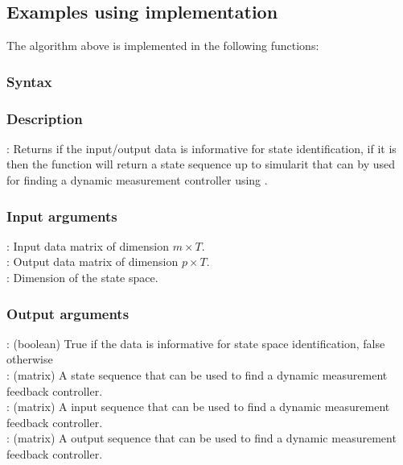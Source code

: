 \subsection{Examples using implementation}
The algorithm above is implemented in the following functions:
\subsubsection*{Syntax}

\subsubsection*{Description}
: Returns if the input/output data is informative for state identification, if it is then the function will return a state sequence up to simularit that can by used for finding a dynamic measurement controller using .

\subsubsection*{Input arguments}
\textbf{}: Input data matrix of dimension $m \times T$.\\
\textbf{}: Output data matrix of dimension $p \times T$.\\
\textbf{}: Dimension of the state space.

\subsubsection*{Output arguments}
\textbf{}: (boolean) True if the data is informative for state space identification, false otherwise\\
\textbf{}: (matrix) A state sequence that can be used to find a dynamic measurement feedback controller.\\
\textbf{}: (matrix) A input sequence that can be used to find a dynamic measurement feedback controller.\\
\textbf{}: (matrix) A output sequence that can be used to find a dynamic measurement feedback controller.

